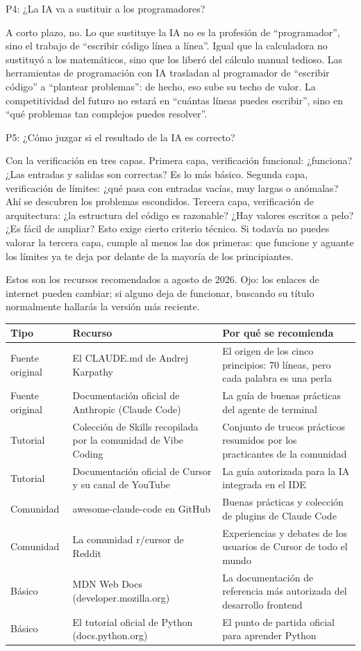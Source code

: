 P4: ¿La IA va a sustituir a los programadores?

A corto plazo, no. Lo que sustituye la IA no es la profesión de “programador”, sino el trabajo de “escribir código línea a línea”. Igual que la calculadora no sustituyó a los matemáticos, sino que los liberó del cálculo manual tedioso. Las herramientas de programación con IA trasladan al programador de “escribir código” a “plantear problemas”: de hecho, eso sube su techo de valor. La competitividad del futuro no estará en “cuántas líneas puedes escribir”, sino en “qué problemas tan complejos puedes resolver”.

P5: ¿Cómo juzgar si el resultado de la IA es correcto?

Con la verificación en tres capas. Primera capa, verificación funcional: ¿funciona? ¿Las entradas y salidas son correctas? Es lo más básico. Segunda capa, verificación de límites: ¿qué pasa con entradas vacías, muy largas o anómalas? Ahí se descubren los problemas escondidos. Tercera capa, verificación de arquitectura: ¿la estructura del código es razonable? ¿Hay valores escritos a pelo? ¿Es fácil de ampliar? Esto exige cierto criterio técnico. Si todavía no puedes valorar la tercera capa, cumple al menos las dos primeras: que funcione y aguante los límites ya te deja por delante de la mayoría de los principiantes.


Estos son los recursos recomendados a agosto de 2026. Ojo: los enlaces de internet pueden cambiar; si alguno deja de funcionar, buscando su título normalmente hallarás la versión más reciente.

\begin{center}
\begin{tabularx}{\linewidth}{|X|X|X|}
\hline
\textbf{Tipo} & \textbf{Recurso} & \textbf{Por qué se recomienda} \tabularnewline
\hline
Fuente original & El CLAUDE.md de Andrej Karpathy & El origen de los cinco principios: 70 líneas, pero cada palabra es una perla \tabularnewline
Fuente original & Documentación oficial de Anthropic (Claude Code) & La guía de buenas prácticas del agente de terminal \tabularnewline
Tutorial & Colección de Skills recopilada por la comunidad de Vibe Coding & Conjunto de trucos prácticos resumidos por los practicantes de la comunidad \tabularnewline
Tutorial & Documentación oficial de Cursor y su canal de YouTube & La guía autorizada para la IA integrada en el IDE \tabularnewline
Comunidad & awesome-claude-code en GitHub & Buenas prácticas y colección de plugins de Claude Code \tabularnewline
Comunidad & La comunidad r/cursor de Reddit & Experiencias y debates de los usuarios de Cursor de todo el mundo \tabularnewline
Básico & MDN Web Docs (developer.mozilla.org) & La documentación de referencia más autorizada del desarrollo frontend \tabularnewline
Básico & El tutorial oficial de Python (docs.python.org) & El punto de partida oficial para aprender Python \tabularnewline
\hline
\end{tabularx}
\end{center}

